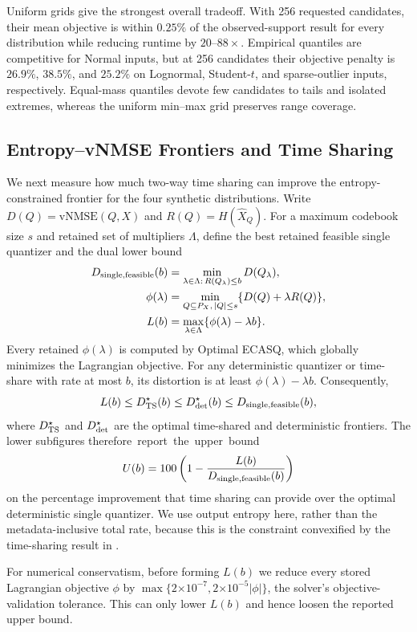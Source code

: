 \documentclass[11pt,letterpaper]{article}
\newcommand{\vnmse}{\mathrm{vNMSE}}
\begin{document}
{Uniform grids give the strongest overall tradeoff.  With 256 requested
candidates, their mean objective is within $0.25\%$ of the observed-support
result for every distribution while reducing runtime by $20$--$88\times$.
Empirical quantiles are competitive for Normal inputs, but at 256 candidates
their objective penalty is $26.9\%$, $38.5\%$, and $25.2\%$ on Lognormal,
Student-$t$, and sparse-outlier inputs, respectively.  Equal-mass quantiles
devote few candidates to tails and isolated extremes, whereas the uniform
min--max grid preserves range coverage.

\subsection{Entropy--vNMSE Frontiers and Time Sharing}
\label{app:eval-entropy-frontier}

We next measure how much two-way time sharing can improve the
entropy-constrained frontier for the four synthetic distributions.  Write
$D(Q)=\vnmse(Q,X)$ and $R(Q)=H(\widehat X_Q)$.  For a maximum codebook size
$s$ and retained set of multipliers $\Lambda$, define the best retained
feasible single quantizer and the dual lower bound
\[
\begin{aligned}
D_{\rm single,feasible}(b)
  &=\min_{\lambda\in\Lambda:\,R(Q_\lambda)\le b}D(Q_\lambda),\\
\phi(\lambda)
  &=\min_{Q\subseteq P_X,\,|Q|\le s}
      \{D(Q)+\lambda R(Q)\},\\
L(b)&=\max_{\lambda\in\Lambda}\{\phi(\lambda)-\lambda b\}.
\end{aligned}
\]
Every retained $\phi(\lambda)$ is computed by Optimal ECASQ, which globally
minimizes the Lagrangian objective.  For any deterministic quantizer or
time-share with rate at most $b$, its distortion is at least
$\phi(\lambda)-\lambda b$.  Consequently,
\[
L(b)\le D_{\rm TS}^\star(b)\le D_{\rm det}^\star(b)
     \le D_{\rm single,feasible}(b),
\]
where $D_{\rm TS}^\star$ and $D_{\rm det}^\star$ are the optimal time-shared
and deterministic frontiers.  The lower subfigures \mbox{therefore report the
upper bound}
\[
U(b)=100\left(1-\frac{L(b)}{D_{\rm single,feasible}(b)}\right)
\]
on the percentage improvement that time sharing can provide over the optimal
deterministic single quantizer.  We use output entropy here, rather than the
metadata-inclusive total rate, because this is the constraint convexified
by the time-sharing result in .

For numerical conservatism, before forming $L(b)$ we reduce every stored
Lagrangian objective $\phi$ by
$\max\{2\mathord\times10^{-7},2\mathord\times10^{-5}|\phi|\}$, the solver's
objective-validation tolerance.  This can only lower $L(b)$ and hence loosen
the reported upper bound.

}
\end{document}
